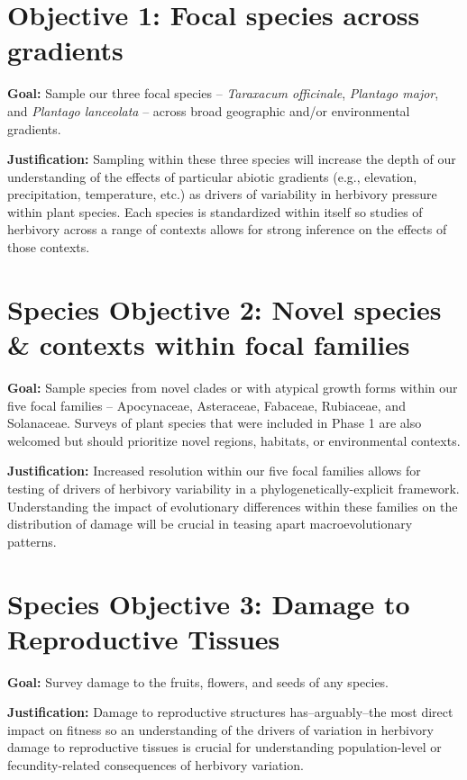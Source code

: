 \documentclass[
  letterpaper,
  oneside,
  open=any]{scrbook}
\begin{document}
\section{Objective 1: Focal species across
gradients}\label{objective-1-focal-species-across-gradients}

\textbf{Goal: }Sample our three focal species -- \emph{Taraxacum
officinale}, \emph{Plantago major}, and \emph{Plantago lanceolata} --
across broad geographic and/or environmental gradients.

\textbf{Justification:} Sampling within these three species will
increase the depth of our understanding of the effects of particular
abiotic gradients (e.g., elevation, precipitation, temperature, etc.) as
drivers of variability in herbivory pressure within plant species. Each
species is standardized within itself so studies of herbivory across a
range of contexts allows for strong inference on the effects of those
contexts.

\section{Species Objective 2: Novel species \& contexts within focal
families}\label{species-objective-2-novel-species-contexts-within-focal-families}

\textbf{Goal: }Sample species from novel clades or with atypical growth
forms within our five focal families -- Apocynaceae, Asteraceae,
Fabaceae, Rubiaceae, and Solanaceae. Surveys of plant species that were
included in Phase 1 are also welcomed but should prioritize novel
regions, habitats, or environmental contexts.

\textbf{Justification:} Increased resolution within our five focal
families allows for testing of drivers of herbivory variability in a
phylogenetically-explicit framework. Understanding the impact of
evolutionary differences within these families on the distribution of
damage will be crucial in teasing apart macroevolutionary patterns.

\section{Species Objective 3: Damage to Reproductive
Tissues}\label{species-objective-3-damage-to-reproductive-tissues}

\textbf{Goal: }Survey damage to the fruits, flowers, and seeds of any
species.

\textbf{Justification:} Damage to reproductive structures
has--arguably--the most direct impact on fitness so an understanding of
the drivers of variation in herbivory damage to reproductive tissues is
crucial for understanding population-level or fecundity-related
consequences of herbivory variation.
\end{document}
